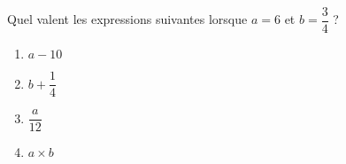 
\begin{exercice}\label{exo2smath-0155}

    Quel valent les expressions suivantes lorsque \( a=6\) et \( b=\dfrac{ 3 }{ 4 }\) ?
    \begin{multicols}{3}
    \begin{enumerate}
        \item
            \( a-10\)
        \item
            \( b+\dfrac{ 1 }{ 4 }\)
        \item
            \( \dfrac{ a }{ 12 }\)
        \item
            \( a\times b\)
    \end{enumerate}
    \end{multicols}

\end{exercice}
